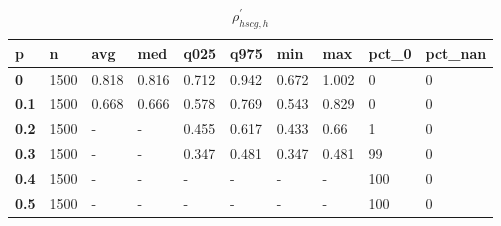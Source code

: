 \begin{table}[h]
 \centering 
\footnotesize
\caption{$\rho_{hscg,h}^\prime $}
\label{tab:alphahscgh}
\begin{tabular}[h]{|l|l|l|l|l|l|l|l|l|l|
    } \hline
\textbf{ p} & \textbf{ n} & \textbf{ avg} & \textbf{ med} & \textbf{ q025} & \textbf{ q975} & \textbf{ min} & \textbf{ max} & \textbf{ pct\_0} & \textbf{ pct\_nan}
    \\ \hline
  \textbf{  0} & 1500 & 0.818 & 0.816 & 0.712 & 0.942 & 0.672 & 1.002 &   0 & 0
    \\ \hline
  \textbf{0.1} & 1500 & 0.668 & 0.666 & 0.578 & 0.769 & 0.543 & 0.829 &   0 & 0
    \\ \hline
  \textbf{0.2} & 1500 & - & - & 0.455 & 0.617 & 0.433 &  0.66 &   1 & 0
    \\ \hline
  \textbf{0.3} & 1500 & - & - & 0.347 & 0.481 & 0.347 & 0.481 &  99 & 0
    \\ \hline
  \textbf{0.4} & 1500 & - & - & - & - & - & - & 100 & 0
    \\ \hline
  \textbf{0.5} & 1500 & - & - & - & - & - & - & 100 & 0
    \\ \hline
 \end{tabular}
 \end{table}
